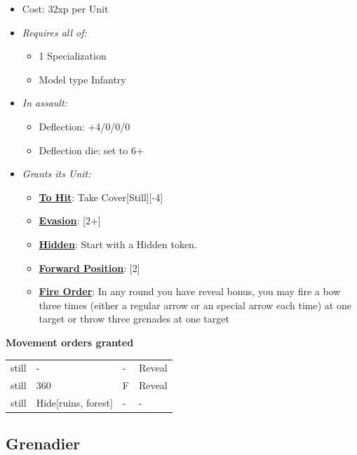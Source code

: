 \documentclass[a4paper,12pt]{article}
\begin{document}
\begin{itemize}
\item Cost: 32xp per Unit
\item \textit{Requires all of:}
\begin{itemize}
\item 1 Specialization
\item Model type Infantry
\end{itemize}

\item \textit{In assault:}
\begin{itemize}
\item Deflection: +4/0/0/0
\item Deflection die: set to 6+
\end{itemize}



\item \textit{Grants its Unit:}
\begin{itemize}
\item \textbf{\hyperref[rule-special-to-hit]{To Hit}}: Take Cover[Still][-4]
\item \textbf{\hyperref[rule-special-evasion]{Evasion}}: [2+]
\item \textbf{\hyperref[rule-special-hidden]{Hidden}}: Start with a Hidden token.
\item \textbf{\hyperref[rule-special-forward-position]{Forward Position}}: [2]
\item \textbf{\hyperref[rule-special-fire-order]{Fire Order}}: In any round you have reveal bonus, you may fire a bow three times (either a regular arrow or an special arrow each time) at one target or throw three grenades at one target

\end{itemize}


\end{itemize}
\noindent\textbf{Movement orders granted}

\begin{tabular}{llll}
still & - & - & Reveal \\
still & 360\textdegree{} & F & Reveal \\
still & Hide[ruins, forest] & - & - \\
\end{tabular}
\vspace{1ex}


\subsection{Grenadier}
\label{equipment-grenadier}
\end{document}
